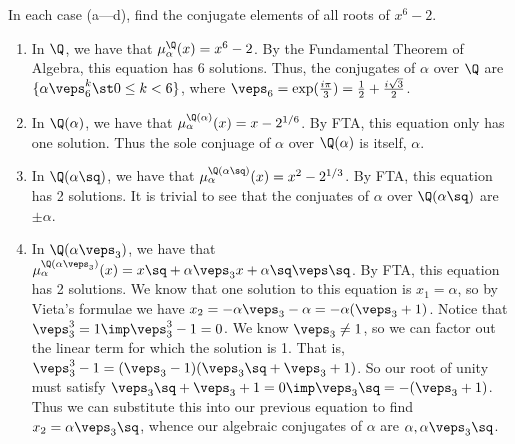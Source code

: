 \documentclass{article}
\begin{document}
\begin{subexercise}
In each case (a---d), find the conjugate elements of all roots of $ x^6-2 $.
\end{subexercise}

\begin{solution}
\begin{enumerate}[label=\alph*)]
  \item In $ \Q $, we have that $ \mu_\alpha^{\Q}(x) = x^6-2 $.
  By the Fundamental Theorem of Algebra, this equation has 6 solutions.
  Thus, the conjugates of $ \alpha $ over $ \Q $ are $ \{\alpha\veps_6^k \st 0\leq k < 6 \} $, where $ \veps_6 = \exp(\frac{i\pi}{3}) = \frac{1}{2}+\frac{i\sqrt 3}{2} $.

  \item In $ \Q(\alpha) $, we have that $ \mu_\alpha^{\Q(\alpha)}(x) =  x - 2^{1/6} $.
  By FTA, this equation only has one solution.
  Thus the sole conjuage of $ \alpha $ over $ \Q(\alpha) $ is itself, $ \alpha $.

  \item In $ \Q(\alpha\sq) $, we have that $ \mu_\alpha^{\Q(\alpha\sq)}(x) = x^2-2^{1/3} $.
  By FTA, this equation has 2 solutions.
  It is trivial to see that the conjuates of $ \alpha $ over $ \Q(\alpha\sq) $ are $ \pm\alpha $.

  \item In $ \Q(\alpha\veps_3) $, we have that $ \mu_\alpha^{\Q(\alpha\veps_3)}(x) = x\sq+\alpha\veps_3x + \alpha\sq\veps\sq $.
  By FTA, this equation has 2 solutions.
  We know that one solution to this equation is $ x_1 = \alpha $, so by Vieta's formulae we have $ x_2 = -\alpha\veps_3 - \alpha = -\alpha(\veps_3+1) $.
  Notice that $ \veps_3^3 = 1 \imp \veps_3^3-1=0 $.
  We know $ \veps_3\neq 1 $, so we can factor out the linear term for which the solution is 1.
  That is, $ \veps_3^3-1 = (\veps_3-1)(\veps_3\sq+\veps_3+1) $.
  So our root of unity must satisfy $ \veps_3\sq+\veps_3+1 = 0 \imp \veps_3\sq=-(\veps_3+1) $.
  Thus we can substitute this into our previous equation to find $ x_2 = \alpha\veps_3\sq $, whence our algebraic conjugates of $ \alpha $ are $ \alpha, \alpha\veps_3\sq $.
\end{enumerate}
\end{solution}
\end{document}
